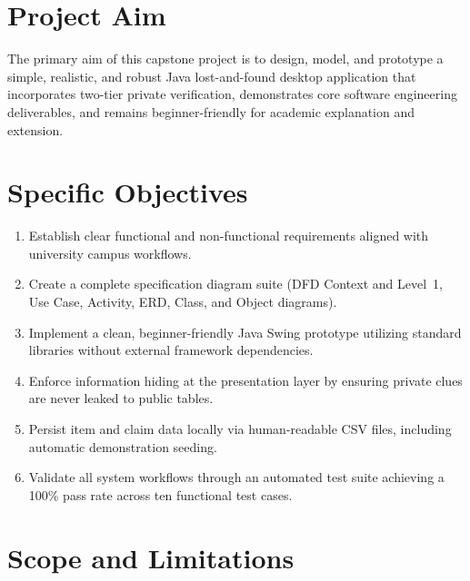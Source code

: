 \documentclass[11pt,a4paper]{article}
\begin{document}
\section{Project Aim}
The primary aim of this capstone project is to design, model, and prototype a simple, realistic, and robust Java lost-and-found desktop application that incorporates two-tier private verification, demonstrates core software engineering deliverables, and remains beginner-friendly for academic explanation and extension.

\section{Specific Objectives}
\begin{enumerate}
    \item Establish clear functional and non-functional requirements aligned with university campus workflows.
    \item Create a complete specification diagram suite (DFD Context and Level~1, Use Case, Activity, ERD, Class, and Object diagrams).
    \item Implement a clean, beginner-friendly Java Swing prototype utilizing standard libraries without external framework dependencies.
    \item Enforce information hiding at the presentation layer by ensuring private clues are never leaked to public tables.
    \item Persist item and claim data locally via human-readable CSV files, including automatic demonstration seeding.
    \item Validate all system workflows through an automated test suite achieving a 100\% pass rate across ten functional test cases.
\end{enumerate}

\section{Scope and Limitations}
\end{document}
